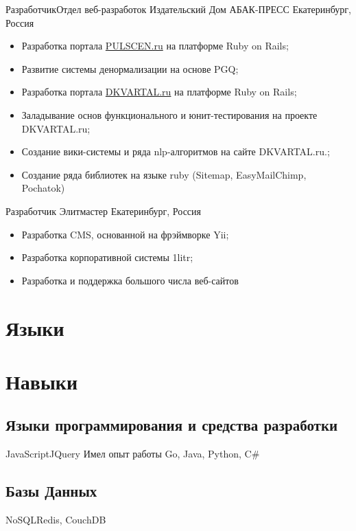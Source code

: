 \documentclass[11pt,a4paper]{moderncv}
\begin{document}
  {Разработчик}{Отдел веб-разработок}
  {Издательский Дом АБАК-ПРЕСС}
  {Екатеринбург, Россия}
{
\begin{itemize}
  \item Разработка портала \href{http://pulscen.ru}{PULSCEN.ru} на платформе Ruby on Rails;
  \item Развитие системы денормализации на основе PGQ;
  \item Разработка портала \href{http://dkvartal.ru}{DKVARTAL.ru} на платформе Ruby on Rails;
  \item Заладывание основ функционального и юнит-тестирования на проекте {DKVARTAL.ru};
  \item Создание вики-системы и ряда nlp-алгоритмов на сайте {DKVARTAL.ru}.;
  \item Создание ряда библиотек на языке ruby (Sitemap, EasyMailChimp, Pochatok)
\end{itemize}
}

\cvitem {}{}

  {Разработчик}{}
  {Элитмастер}
  {Екатеринбург, Россия}
{
\begin{itemize}
  \item Разработка CMS, основанной на фрэймворке Yii;
  \item Разработка корпоративной системы {1litr};
  \item Разработка и поддержка большого числа веб-сайтов
\end{itemize}
}


\section{Языки}

\section{Навыки}
\subsection{Языки программирования и средства разработки}
{JavaScript}{JQuery}
\cvcomputer
{Имел опыт работы} {Go, Java, Python, C\#}
{}{}
\subsection{Базы Данных}
           {NoSQL}{Redis, CouchDB}
\end{document}
